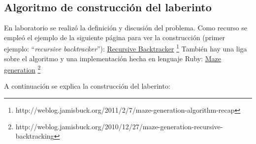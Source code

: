 \subsection{Algoritmo de construcci\'on del laberinto}


En laboratorio se realizó la definición y discusión del problema.
Como recurso se empleó el ejemplo de la siguiente página para ver la construcción (primer ejemplo: ``\textit{recursive backtracker}''):
\href{http://weblog.jamisbuck.org/2011/2/7/maze-generation-algorithm-recap}{Recursive Backtracker}
\footnote{http://weblog.jamisbuck.org/2011/2/7/maze-generation-algorithm-recap}
También hay una liga sobre el algoritmo y una implementación hecha en lenguaje Ruby:
\href{http://weblog.jamisbuck.org/2010/12/27/maze-generation-recursive-backtracking}{Maze generation}
\footnote{http://weblog.jamisbuck.org/2010/12/27/maze-generation-recursive-backtracking}

\noindent A continuación se explica la construcción del laberinto:


